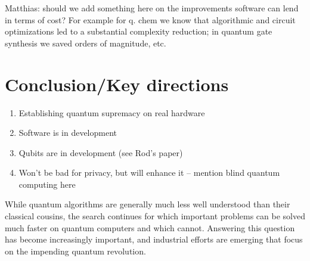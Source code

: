 \documentclass[journal]{IEEEtran}
\begin{document}

{\color{red} Matthias: should we add something here on the improvements software can lend in terms of cost?  For example for q. chem we know that algorithmic and circuit optimizations led to a substantial complexity reduction; in quantum gate synthesis we saved orders of magnitude, etc.}

\section{Conclusion/Key directions}
\begin{enumerate}
\item    Establishing quantum supremacy on real hardware
\item     Software is in development
\item     Qubits are in development (see Rod's paper)
\item     Won't be bad for privacy, but will enhance it -- mention blind quantum computing here
\end{enumerate}

While quantum algorithms are generally much less well understood than their classical cousins, the search continues for which important problems can be solved much faster on quantum computers and which cannot. Answering this question has become increasingly important, and industrial efforts are emerging that focus on the impending quantum revolution.



%
%
\end{document}
